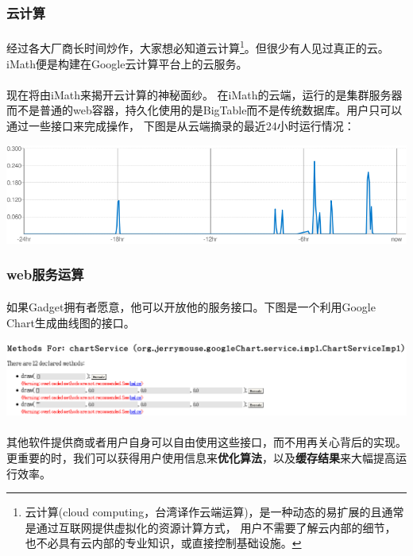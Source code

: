 \documentclass[12pt,a4paper,titlepage]{article}
\begin{document}
\subsubsection{云计算}
\paragraph{}  
经过各大厂商长时间炒作，大家想必知道云计算\footnote{云计算(cloud computing，台湾译作云端运算)，是一种动态的易扩展的且通常是通过互联网提供虚拟化的资源计算方式， 用户不需要了解云内部的细节，也不必具有云内部的专业知识，或直接控制基础设施。}。但很少有人见过真正的云。iMath便是构建在Google云计算平台上的云服务。
\paragraph{}
现在将由iMath来揭开云计算的神秘面纱。
在iMath的云端，运行的是集群服务器而不是普通的web容器，持久化使用的是BigTable而不是传统数据库。用户只可以通过一些接口来完成操作，
下图是从云端摘录的最近24小时运行情况：

\includegraphics[width=\textwidth]{chart.png}

\subsubsection{web服务运算}
\paragraph{}
如果Gadget拥有者愿意，他可以开放他的服务接口。下图是一个利用Google Chart生成曲线图的接口。

\includegraphics[width=\textwidth]{dwr.png}
\paragraph{}
其他软件提供商或者用户自身可以自由使用这些接口，而不用再关心背后的实现。
更重要的时，我们可以获得用户使用信息来\textbf{优化算法}，以及\textbf{缓存结果}来大幅提高运行效率。
\end{document}
